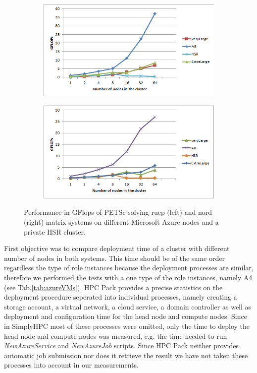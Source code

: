 \documentclass[3p,times]{elsarticle}
\begin{document}
\begin{figure}
\centering
\begin{subfigure}{.5\textwidth}
  \centering
	\includegraphics[width=\linewidth]{ruppel}  
  \label{fig:ruepel}
\end{subfigure}%
\begin{subfigure}{.5\textwidth}
  \centering
  \includegraphics[width=\linewidth]{nord.png}
  \label{fig:nord}
\end{subfigure}
\caption{Performance in GFlops of PETSc solving ruep (left) and nord (right) matrix systems on different Microsoft Azure nodes and a private HSR cluster. }
\label{fig:test}
\end{figure}

 
First objective was to compare deployment time of a cluster with different number of nodes in both systems. This time should be of the same order regardless the type of role instances because the deployment processes are similar, therefore we performed the tests with a one type of the role instances, namely A4 (see Tab.\ref{tab:azureVMs}). HPC Pack provides a precise statistics on the deployment procedure seperated into individual processes, namely creating a storage account, a virtual network, a cloud service, a domain controller as well as  deployment and configuration time for the head node and compute nodes. Since in SimplyHPC most of these processes were omitted, only the time to deploy the head node and compute nodes was measured, e.g. the time needed to run \textit{NewAzureService} and \textit{NewAzureJob} scripts. Since HPC Pack neither provides automatic job submission nor does it retrieve the result we have not taken these processes into account in our measurements. 
\end{document}
